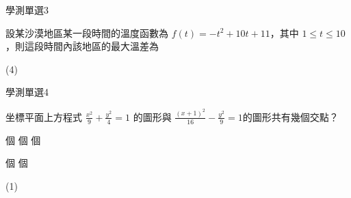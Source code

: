     \begin{QUESTION}
        \begin{ExamInfo}{96}{學測}{單選}{3}
        \end{ExamInfo}
        \begin{ExamAnsRateInfo}{58}{88}{62}{24}
        \end{ExamAnsRateInfo}
        \begin{QBODY}
            設某沙漠地區某一段時間的溫度函數為 $f(t) = -t^2 +10t +11$，其中 $1 \leq  t \leq 10$ ，則這段時間內該地區的最大溫差為
			\begin{QOPS} 
			\end{QOPS}
        \end{QBODY}
        \begin{QFROMS}
        \end{QFROMS}
        \begin{QTAGS}\end{QTAGS}
        \begin{QANS}
            (4)
        \end{QANS}
        \begin{QSOLLIST}
        \end{QSOLLIST}
        \begin{QEMPTYSPACE}
        \end{QEMPTYSPACE}
    \end{QUESTION}
    \begin{QUESTION}
        \begin{ExamInfo}{96}{學測}{單選}{4}
        \end{ExamInfo}
        \begin{ExamAnsRateInfo}{47}{78}{46}{17}
        \end{ExamAnsRateInfo}
        \begin{QBODY}
            坐標平面上方程式 $\frac{x^2}{9} + \frac{y^2}{4} =1$ 的圖形與 $\frac{(x+1)^2}{16} - \frac{y^2}{9}=1$的圖形共有幾個交點？ 
			\begin{QOPS} 
				\QOP 1 個 
				\QOP 2 個 
				\QOP 3 個

				\QOP 4 個 
				\QOP 0 個
			\end{QOPS}
        \end{QBODY}
        \begin{QFROMS}
        \end{QFROMS}
        \begin{QTAGS}\end{QTAGS}
        \begin{QANS}
            (1)
        \end{QANS}
        \begin{QSOLLIST}
        \end{QSOLLIST}
        \begin{QEMPTYSPACE}
        \end{QEMPTYSPACE}
    \end{QUESTION}
